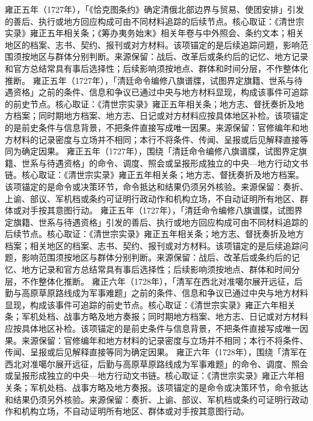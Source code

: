 雍正五年（1727年），「《恰克图条约》确定清俄北部边界与贸易、使团安排」引发的善后、执行或地方回应构成可由不同材料追踪的后续节点。核心取证：《清世宗实录》雍正五年相关条；《筹办夷务始末》相关年卷与中外照会、条约文本；相关地区的档案、志书、契约、报刊或对方材料。该项锚定的是后续追踪问题，影响范围须按地区与群体分别判断。来源保留：战后、改革后或条约后的记忆、地方记录和官方总结常具有事后选择性；后续影响须按地点、群体和时间分层，不作整体化推断。
雍正五年（1727年），「清廷命令编修八旗谱牒，试图界定旗籍、世系与待遇资格」之前的条件、信息和争议已通过中央与地方材料显现，构成该事件可追踪的前史节点。核心取证：《清世宗实录》雍正五年相关条；地方志、督抚奏折及地方档案；同时期地方档案、地方志、日记或对方材料应按具体地区补检。该项锚定的是前史条件与信息背景，不把条件直接写成唯一因果。来源保留：官修编年和地方材料的记录密度与立场并不相同；本行不将条件、传闻、呈报或后见解释直接等同为确定因果。
雍正五年（1727年），围绕「清廷命令编修八旗谱牒，试图界定旗籍、世系与待遇资格」的命令、调度、照会或呈报形成独立的中央—地方行动文书链。核心取证：《清世宗实录》雍正五年相关条；地方志、督抚奏折及地方档案。该项锚定的是命令或决策环节，命令抵达和结果仍须另外核验。来源保留：奏折、上谕、部议、军机档或条约可证明行政动作和机构立场，不自动证明所有地区、群体或对手按其意图行动。
雍正五年（1727年），「清廷命令编修八旗谱牒，试图界定旗籍、世系与待遇资格」引发的善后、执行或地方回应构成可由不同材料追踪的后续节点。核心取证：《清世宗实录》雍正五年相关条；地方志、督抚奏折及地方档案；相关地区的档案、志书、契约、报刊或对方材料。该项锚定的是后续追踪问题，影响范围须按地区与群体分别判断。来源保留：战后、改革后或条约后的记忆、地方记录和官方总结常具有事后选择性；后续影响须按地点、群体和时间分层，不作整体化推断。
雍正六年（1728年），「清军在西北对准噶尔展开远征，后勤与高原草原路线成为军事难题」之前的条件、信息和争议已通过中央与地方材料显现，构成该事件可追踪的前史节点。核心取证：《清世宗实录》雍正六年相关条；军机处档、战事方略及地方奏报；同时期地方档案、地方志、日记或对方材料应按具体地区补检。该项锚定的是前史条件与信息背景，不把条件直接写成唯一因果。来源保留：官修编年和地方材料的记录密度与立场并不相同；本行不将条件、传闻、呈报或后见解释直接等同为确定因果。
雍正六年（1728年），围绕「清军在西北对准噶尔展开远征，后勤与高原草原路线成为军事难题」的命令、调度、照会或呈报形成独立的中央—地方行动文书链。核心取证：《清世宗实录》雍正六年相关条；军机处档、战事方略及地方奏报。该项锚定的是命令或决策环节，命令抵达和结果仍须另外核验。来源保留：奏折、上谕、部议、军机档或条约可证明行政动作和机构立场，不自动证明所有地区、群体或对手按其意图行动。
